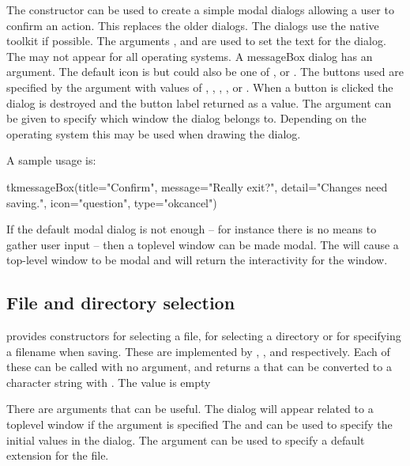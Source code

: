 The  constructor can be used to create a simple modal dialogs allowing a user to confirm an action. This replaces the older  dialogs. The  dialogs use the native toolkit if possible. The arguments ,  and  are used to set the text for the dialog. The  may not appear for all operating systems. A messageBox dialog has an  argument. The  default icon is  but could also be one of ,  or . The buttons used are specified by the  argument with values of , , , , or . When a button is clicked the dialog is destroyed and the button label returned as a value. The argument  can be given to specify which window the dialog belongs to. Depending on the operating system this may be used when drawing the dialog.

A sample usage is:
\begin{Schunk}
\begin{Sinput}
 tkmessageBox(title="Confirm", 
              message="Really exit?", detail="Changes need saving.", 
              icon="question", type="okcancel")
\end{Sinput}
\end{Schunk}
If the default modal dialog is not enough -- for instance there is no means to gather user input -- then a toplevel window can be made modal. The  will cause a top-level window to be modal and  will return the interactivity for the window.

\subsection{File and directory selection}
\label{sec:file-direct-select}

\Tk\/ provides constructors for selecting a file, for selecting a
directory or for specifying a filename when saving. These are
implemented by ,
, and 
respectively. Each of these can be called with no argument, and
returns a  that can be converted to a character string
with . The value is empty


There are arguments that can be useful.  The dialog will appear
related to a toplevel window if the argument
 is specified The
 and
 can be used to specify the
initial values in the dialog.  The
 argument can be used to specify a
default extension for the file.

